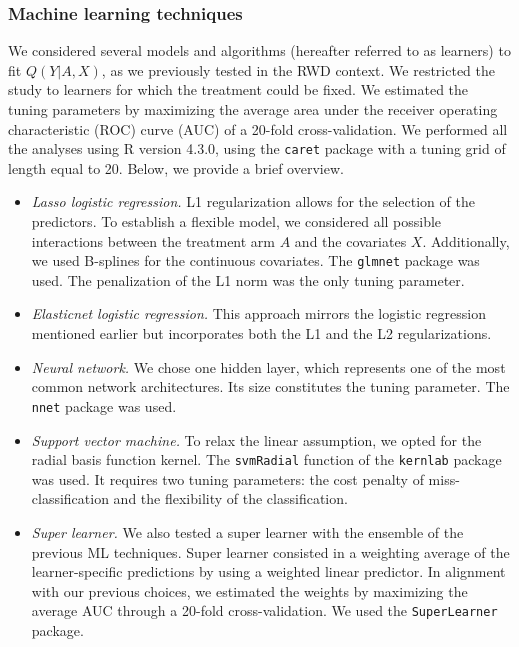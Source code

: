 \documentclass{article}
\begin{document}
\subsubsection{Machine learning techniques}

We considered several models and algorithms (hereafter referred to as learners) to fit $Q(Y| A, X)$,  as we previously tested in the RWD context.\cite{le_borgne_g-computation_2021} We restricted the study to learners for which the treatment could be fixed. We estimated the tuning parameters by maximizing the average area under the receiver operating characteristic (ROC) curve (AUC) of a 20-fold cross-validation. We performed all the analyses using R version 4.3.0, using the \texttt{caret} package with a tuning grid of length equal to 20. Below, we provide a brief overview. 

\begin{itemize}

\item \textit{Lasso logistic regression.} L1 regularization allows for the selection of the predictors. To establish a flexible model, we considered all possible interactions between the treatment arm $A$ and the covariates $X$.  Additionally,  we used B-splines for the continuous covariates.  The \texttt{glmnet} package was used. The penalization of the L1 norm was the only tuning parameter. 


\item \textit{Elasticnet logistic regression.} This approach mirrors the logistic regression mentioned earlier but incorporates both the L1 and the L2 regularizations.

\item \textit{Neural network.}  We chose one hidden layer, which represents one of the most common network architectures. Its size constitutes the tuning parameter. The \texttt{nnet}  package was used.

\item \textit{Support vector machine.} To relax the linear assumption,  we opted for the radial basis function kernel.  The \texttt{svmRadial} function of the \texttt{kernlab} package was used.  It  requires two tuning parameters: the cost penalty of miss-classification and the flexibility of the classification.

\item \textit{Super learner.} We also tested a super learner with the ensemble of the previous ML techniques.  Super learner consisted in a weighting average of the learner-specific predictions by using a weighted linear predictor.  In alignment with our previous choices, \cite{le_borgne_g-computation_2021} we estimated the weights by maximizing the average AUC through a 20-fold cross-validation.  We used the \texttt{SuperLearner} package.

\end{itemize}
\end{document}
